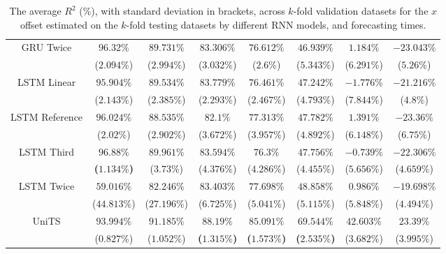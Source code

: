 \begin{table}[!ht]
{\begin{tabular}{|c|c|c|c|c|c|c|c|}
			\multirow{2}{*}{GRU Twice} & $96.32\%$ & $89.731\%$ & $83.306\%$ & $76.612\%$ & $46.939\%$ & $1.184\%$ & $-23.043\%$ \\
			 & ($2.094\%$) & ($2.994\%$) & ($3.032\%$) & ($2.6\%$) & ($5.343\%$) & ($6.291\%$) & ($5.26\%$) \\ \hline
			\multirow{2}{*}{LSTM Linear} & $95.904\%$ & $89.534\%$ & $83.779\%$ & $76.461\%$ & $47.242\%$ & $-1.776\%$ & $-21.216\%$ \\
			 & ($2.143\%$) & ($2.385\%$) & ($2.293\%$) & ($2.467\%$) & ($4.793\%$) & ($7.844\%$) & ($4.8\%$) \\ \hline
			\multirow{2}{*}{LSTM Reference} & $96.024\%$ & $88.535\%$ & $82.1\%$ & $77.313\%$ & $47.782\%$ & $1.391\%$ & $-23.36\%$ \\
			 & ($2.02\%$) & ($2.902\%$) & ($3.672\%$) & ($3.957\%$) & ($4.892\%$) & ($6.148\%$) & ($6.75\%$) \\ \hline
			\multirow{2}{*}{LSTM Third} & $\mathbf{96.88\%}$ & $89.961\%$ & $83.594\%$ & $76.3\%$ & $47.756\%$ & $-0.739\%$ & $-22.306\%$ \\
			 & \textbf{(}$\mathbf{1.134\%}$\textbf{)} & ($3.73\%$) & ($4.376\%$) & ($4.286\%$) & ($4.455\%$) & ($5.656\%$) & ($4.659\%$) \\ \hline
			\multirow{2}{*}{LSTM Twice} & $59.016\%$ & $82.246\%$ & $83.403\%$ & $77.698\%$ & $48.858\%$ & $0.986\%$ & $-19.698\%$ \\
			 & ($44.813\%$) & ($27.196\%$) & ($6.725\%$) & ($5.041\%$) & ($5.115\%$) & ($5.848\%$) & ($4.494\%$) \\ \hline
			\multirow{2}{*}{UniTS} & $93.994\%$ & $91.185\%$ & $\mathbf{88.19\%}$ & $\mathbf{85.091\%}$ & $\mathbf{69.544\%}$ & $42.603\%$ & $23.39\%$ \\
			 & ($0.827\%$) & ($1.052\%$) & \textbf{(}$\mathbf{1.315\%}$\textbf{)} & \textbf{(}$\mathbf{1.573\%}$\textbf{)} & \textbf{(}$\mathbf{2.535\%}$\textbf{)} & ($3.682\%$) & ($3.995\%$) \\ \hline
		\end{tabular}
	}
	\caption{The average $R^{2}$ (\%), with standard deviation in brackets, across $k$-fold validation datasets for the $x$ offset estimated on the $k$-fold testing datasets by different RNN models, and forecasting times.}
	\label{tab:wilcoxon_longitude_no_abs_R2}
\end{table}